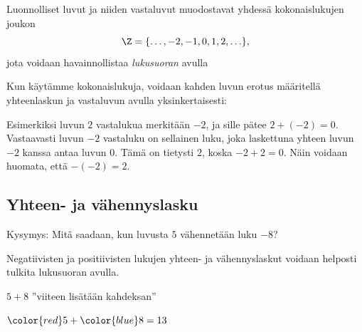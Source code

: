 
Luonnolliset luvut ja niiden vastaluvut muodostavat yhdessä
kokonaislukujen joukon
\[\Z = \{\ldots, -2, -1, 0, 1, 2, \ldots\},\]
jota voidaan havainnollistaa \emph{lukusuoran} avulla

\begin{center}
\begin{lukusuora}{-4}{4}{10}

\end{lukusuora}
\end{center}

Kun käytämme kokonaislukuja, voidaan kahden luvun erotus määritellä
yhteenlaskun ja vastaluvun avulla yksinkertaisesti:

\laatikko{
\[m-n = m+(-n)\]
}

    Esimerkiksi luvun $2$ vastalukua merkitään $-2$, ja sille pätee $2+(-2)=0$. Vastaavasti luvun $-2$ vastaluku on sellainen luku, joka laskettuna yhteen luvun $-2$ kanssa antaa luvun $0$. Tämä on tietysti $2$, koska $-2+2=0$. Näin voidaan huomata, että $-(-2)=2$.
    

\subsection*{Yhteen- ja vähennyslasku}

    Kysymys: Mitä saadaan, kun luvusta $5$ vähennetään luku $-8$?
    
    Negatiivisten ja positiivisten lukujen yhteen- ja vähennyslaskut voidaan helposti tulkita lukusuoran avulla.
    
    
    $5+8$ ''viiteen lisätään kahdeksan''
    \begin{center}
      \begin{lukusuora}{-1}{14}{14}
        {\color{red} }
        \lukusuorauusi
        {\color{red} }
        {\color{blue} }
       \end{lukusuora}
       ${\color{red}5}+{\color{blue}8}=13$
    \end{center}
    
